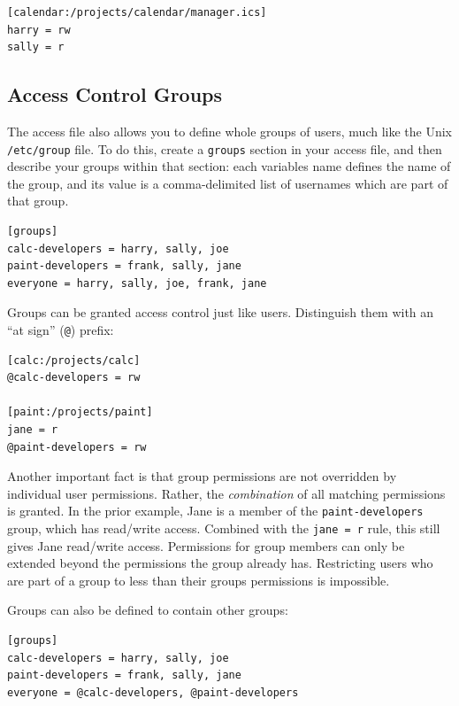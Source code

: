 \begin{verbatim}
[calendar:/projects/calendar/manager.ics]
harry = rw
sally = r
\end{verbatim}

\subsection{Access Control
Groups}\label{svn.serverconfig.pathbasedauthz.groups}

The access file also allows you to define whole groups of users, much
like the Unix \texttt{/etc/group} file. To do this, create a
\texttt{groups} section in your access file, and then describe your
groups within that section: each variable\textquotesingle s name defines
the name of the group, and its value is a comma-delimited list of
usernames which are part of that group.

\begin{verbatim}
[groups]
calc-developers = harry, sally, joe
paint-developers = frank, sally, jane
everyone = harry, sally, joe, frank, jane
\end{verbatim}

Groups can be granted access control just like users. Distinguish them
with an ``at sign'' (\texttt{@}) prefix:

\begin{verbatim}
[calc:/projects/calc]
@calc-developers = rw

[paint:/projects/paint]
jane = r
@paint-developers = rw
\end{verbatim}

Another important fact is that group permissions are not overridden by
individual user permissions. Rather, the \emph{combination} of all
matching permissions is granted. In the prior example, Jane is a member
of the \texttt{paint-developers} group, which has read/write access.
Combined with the \texttt{jane\ =\ r} rule, this still gives Jane
read/write access. Permissions for group members can only be extended
beyond the permissions the group already has. Restricting users who are
part of a group to less than their group\textquotesingle s permissions
is impossible.

Groups can also be defined to contain other groups:

\begin{verbatim}
[groups]
calc-developers = harry, sally, joe
paint-developers = frank, sally, jane
everyone = @calc-developers, @paint-developers
\end{verbatim}

